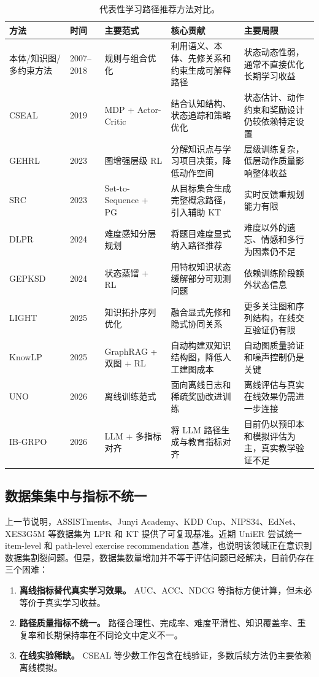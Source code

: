 \documentclass[UTF8,a4paper,zihao=-4]{ctexart}
\begin{document}
\begin{table}[t]
\centering
\caption{代表性学习路径推荐方法对比。}
\label{tab:method-comparison}
\small
\begin{tabularx}{\textwidth}{p{2.2cm}p{1.6cm}p{2.3cm}p{3.4cm}X}
\toprule
\textbf{方法} & \textbf{时间} & \textbf{主要范式} & \textbf{核心贡献} & \textbf{主要局限} \\
\midrule
本体/知识图/多约束方法 & 2007--2018 & 规则与组合优化 & 利用语义、本体、先修关系和约束生成可解释路径 & 状态动态性弱，通常不直接优化长期学习收益 \\
CSEAL & 2019 & MDP + Actor-Critic & 结合认知结构、状态追踪和策略优化 & 状态估计、动作约束和奖励设计仍较依赖特定设置 \\
GEHRL & 2023 & 图增强层级 RL & 分解知识点与学习项目决策，降低动作空间 & 层级训练复杂，低层动作质量影响整体收益 \\
SRC & 2023 & Set-to-Sequence + PG & 从目标集合生成完整概念路径，引入辅助 KT & 实时反馈重规划能力有限 \\
DLPR & 2024 & 难度感知分层规划 & 将题目难度显式纳入路径推荐 & 难度以外的遗忘、情感和多行为因素仍不足 \\
GEPKSD & 2024 & 状态蒸馏 + RL & 用特权知识状态缓解部分可观测问题 & 依赖训练阶段额外状态信息 \\
LIGHT & 2025 & 知识拓扑序列优化 & 融合显式先修和隐式协同关系 & 更多关注图和序列结构，在线交互验证仍有限 \\
KnowLP & 2025 & GraphRAG + 双图 + RL & 自动构建双知识结构图，降低人工建图成本 & 自动图质量验证和噪声控制仍是关键 \\
UNO & 2026 & 离线训练范式 & 面向离线日志和稀疏奖励改进训练 & 离线评估与真实在线效果仍需进一步连接 \\
IB-GRPO & 2026 & LLM + 多指标对齐 & 将 LLM 路径生成与教育指标对齐 & 目前仍以预印本和模拟评估为主，真实教学验证不足 \\
\bottomrule
\end{tabularx}
\end{table}

\subsection{数据集集中与指标不统一}

上一节说明，ASSISTments、Junyi Academy、KDD Cup、NIPS34、EdNet、XES3G5M 等数据集为 LPR 和 KT 提供了可复现基准。近期 UniER 尝试统一 item-level 和 path-level exercise recommendation 基准，也说明该领域正在意识到数据集割裂问题\cite{Cheng2026UniER}。但是，数据集数量增加并不等于评估问题已经解决，目前仍存在三个困难：
\begin{enumerate}
  \item \textbf{离线指标替代真实学习效果。} AUC、ACC、NDCG 等指标方便计算，但未必等价于真实学习收益。
  \item \textbf{路径质量指标不统一。} 路径合理性、完成率、难度平滑性、知识覆盖率、重复率和长期保持率在不同论文中定义不一。
  \item \textbf{在线实验稀缺。} CSEAL 等少数工作包含在线验证，多数后续方法仍主要依赖离线模拟。
\end{enumerate}
\end{document}
